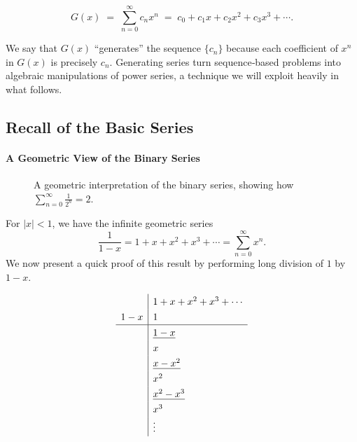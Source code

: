 \documentclass{article}
\begin{document}
\[
G(x) \;=\; \sum_{n=0}^\infty c_n x^n 
\;=\;
c_0 + c_1 x + c_2 x^2 + c_3 x^3 + \cdots.
\]

We say that \(G(x)\) “generates” the sequence \(\{c_n\}\) because each coefficient of \(x^n\) in \(G(x)\) is precisely \(c_n\).  Generating series turn sequence‑based problems into algebraic manipulations of power series, a technique we will exploit heavily in what follows.

\subsection*{Recall of the Basic Series}
\paragraph{A Geometric View of the Binary Series}
\begin{figure}[ht]
  \centering
\caption{A geometric interpretation of the binary series, showing how 
\(\sum_{n=0}^{\infty} \tfrac{1}{2^n} = 2\).}
\end{figure}
For \(|x| < 1\), we have the infinite geometric series
\[
\frac{1}{1-x} = 1 + x + x^2 + x^3 + \cdots = \sum_{n=0}^{\infty} x^n.
\]
We now present a quick proof of this result by performing long division of \(1\) by \(1-x\).

\[
\renewcommand{\arraystretch}{1.3}
\begin{array}{r|l}
 & 1 + x + x^2 + x^3 + \cdots \\ %
1 - x & 1  \\ %
\hline
 & \underline{1 - x} \\
 & x \\
 & \underline{x - x^2} \\
 & x^2 \\
 & \underline{x^2 - x^3} \\
 & x^3 \\
 & \vdots
\end{array}
\]
\end{document}
